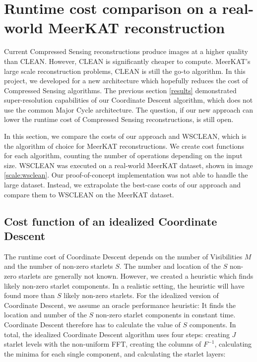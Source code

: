 \section{Runtime cost comparison on a real-world MeerKAT reconstruction}
Current Compressed Sensing reconstructions produce images at a higher quality than CLEAN. However, CLEAN is significantly cheaper to compute. MeerKAT's large scale reconstruction problems, CLEAN is still the go-to algorithm. In this project, we developed for a new architecture which hopefully reduces the cost of Compressed Sensing algorithms. The previous section \ref{results} demonstrated super-resolution capabilities of our Coordinate Descent algorithm, which does not use the common Major Cycle architecture. The question, if our new approach can lower the runtime cost of Compressed Sensing reconstructions, is still open. 

In this section, we compare the costs of our approach and WSCLEAN, which is the algorithm of choice for MeerKAT reconstructions. We create cost functions for each algorithm, counting the number of operations depending on the input size. WSCLEAN was executed on a real-world MeerKAT dataset, shown in image \ref{scale:wsclean}. Our proof-of-concept implementation was not able to handle the large dataset. Instead, we extrapolate the best-case costs of our approach and compare them to WSCLEAN on the MeerKAT dataset.


\subsection{Cost function of an idealized Coordinate Descent}
The runtime cost of Coordinate Descent depends on the number of Visibilities $M$ and the number of non-zero starlets $S$. The number and location of the $S$ non-zero starlets are generally not known. However, we created a heuristic which finds likely non-zero starlet components. In a realistic setting, the heuristic will have found more than $S$ likely non-zero starlets. For the idealized version of Coordinate Descent, we assume an oracle performance heuristic: It finds the location and number of the $S$ non-zero starlet components in constant time. Coordinate Descent therefore has to calculate the value of $S$  components. In total, the idealized Coordinate Descent algorithm uses four steps: creating $J$ starlet levels with the non-uniform FFT, creating the columns of $F^{-1}$, calculating the minima for each single component, and calculating the starlet layers:

